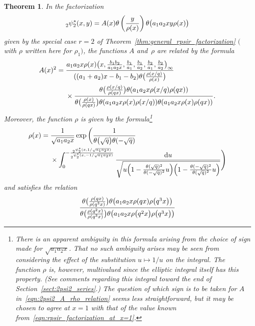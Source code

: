 \documentclass[10pt,a4paper]{amsart}
\numberwithin{equation}{section}
\newtheorem{Theorem}{Theorem}[section]
\newcommand{\dd}{\mathrm{d}}
\begin{document}
\begin{Theorem} \label{thm:2psi2_factorization}
In the factorization
\begin{equation} \label{eqn:weak_2psi2ast_factorization}
_2^{}\psi_2^\ast(x,y) = A(x) \theta\left({y \over \rho(x)}\right) \theta \bigl( a_1a_2xy\rho(x) \bigr)
\end{equation}
given by the special case $r=2$ of Theorem~{\rm\ref{thm:general_rpsir_factorization}} $($with $\rho$ written here for $\rho_1)$, the functions $A$ and~$\rho$ are related by the formula
\begin{align}
A(x)^2 = {}&\frac{a_1a_2x \rho(x) \bigl(x,{b_1b_2 \over a_1a_2x},{b_1 \over a_1},{b_1 \over a_2},{b_2 \over a_1},{b_2 \over a_2}\bigr)_{ \infty} }{ ((a_1+a_2)x-b_1-b_2) \theta\bigl({\rho(x/q) \over \rho(x)}\bigr)}\nonumber\\
&\times \frac{ \theta\bigl( {\rho(x/q) \over \rho(qx)} \bigr) \theta( a_1a_2x\rho(x/q)\rho(qx)) }{\theta\bigl({\rho(x) \over \rho(qx)}\bigr) \theta (a_1a_2x\rho(x)\rho(x/q) ) \theta (a_1a_2x\rho(x)\rho(qx) )}.\label{eqn:2psi2_A_rho_relation}
\end{align}
Moreover, the function $\rho$ is given by the formula\footnote{There is an apparent ambiguity in this formula arising from the choice of sign made for $\sqrt{a_1a_2x}$. That no such ambiguity arises may be seen from considering the effect of the substitution $u \mapsto 1/u$ on the integral. The function $\rho$ is, however, multivalued since the elliptic integral itself has this property. (See comments regarding this integral toward the end of Section~\ref{sect:2psi2_series}.) The question of which sign is to be taken for $A$ in~\eqref{eqn:2psi2_A_rho_relation} seems less straightforward, but it may be chosen to agree at $x=1$ with that of the value known from~\eqref{eqn:rpsir_factorization_at_x=1}.}
\begin{align}
\rho(x) = {}&{1 \over \sqrt{a_1a_2x}}\exp \bigg( {1 \over \theta\bigl(\sqrt{q}\bigr)\theta(-\sqrt{q})} \nonumber \\
&\times\int_0^{-{_2^{}\psi_2^\ast(x,1/\sqrt{a_1a_2x}) \over _2^{}\psi_2^\ast(x,-1/\sqrt{a_1a_2x})}} {\dd u \over \sqrt{u\Bigl( 1-{\theta(\sqrt{q})^2 \over \theta(-\sqrt{q})^2}u\Bigr)\Bigl( 1-{\theta(-\sqrt{q})^2 \over \theta(\sqrt{q})^2}u\Bigr)}} \Bigg) \label{eqn:rho_integral_formula}
\end{align}
and satisfies the relation
\begin{gather}
{\theta\bigl({\rho(qx) \over \rho(q^3x)}\bigr) \theta\bigl(a_1a_2x\rho(qx)\rho\bigl(q^3x\bigr)\bigr) \over \theta\bigl({\rho(q^2x) \over \rho(q^3x)}\bigr) \theta\bigl(a_1a_2x\rho\bigl(q^2x\bigr)\rho\bigl(q^3x\bigr)\bigr)} \nonumber\\

\end{gather}
\end{Theorem}
\end{document}
